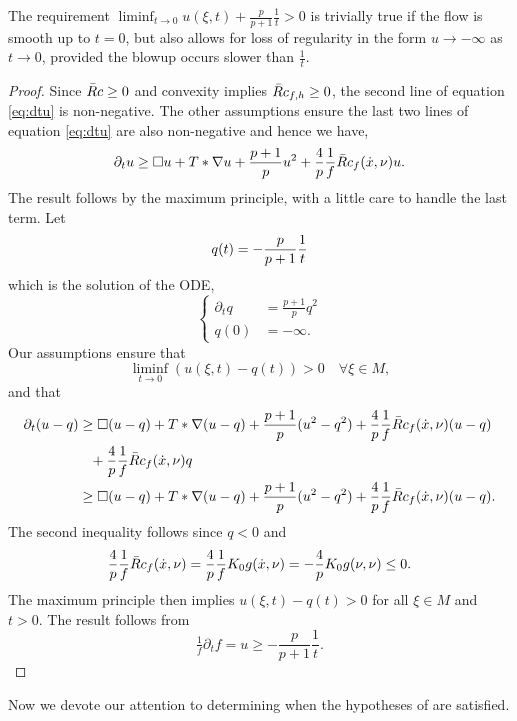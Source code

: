 \begin{rem}
The requirement $\liminf_{t\to 0} u(\xi, t) + \frac{p}{p+1} \tfrac{1}{t} > 0$ is trivially true if the flow is smooth up to $t=0$, but also allows for loss of regularity in the form $u \to -\infty$ as $t \to 0$, provided the blowup occurs slower than $\tfrac{1}{t}$.
\end{rem}

\begin{proof}
Since $\-Rc \geq 0$ and convexity implies $\-Rc_{f,h} \geq 0$, the second line of equation \eqref{eq:dtu} is non-negative. The other assumptions ensure the last two lines of equation \eqref{eq:dtu} are also non-negative and hence we have,
\[
\partial_t u \geq \Box u + T \ast \nabla u + \fr{p+1}{p} u^2 + \frac{4}{p} \frac{1}{f} \-Rc_f(\dot{x}, \nu)u.
\]
The result follows by the maximum principle, with a little care to handle the last term. Let
\[
q(t) = -\fr{p}{p+1} \frac{1}{t}
\]
which is the solution of the ODE,
\[
\begin{cases}
\partial_t q &= \frac{p+1}{p} q^2 \\
q(0) &= -\infty.
\end{cases}
\]
Our assumptions ensure that
\[
\liminf_{t\to 0} (u(\xi, t) - q(t)) > 0 \quad \forall \xi \in M,
\]
and that
\[
\begin{split}
\partial_t (u - q) &\geq \Box (u - q) + T \ast \nabla (u - q) + \fr{p+1}{p}(u^2 - q^2) + \frac{4}{p} \frac{1}{f} \-Rc_f(\dot{x}, \nu)(u - q) \\
&\hp{=} + \frac{4}{p} \frac{1}{f} \-Rc_f(\dot{x}, \nu) q \\
&\geq \Box (u - q) + T \ast \nabla (u - q) + \fr{p+1}{p}(u^2 - q^2) + \frac{4}{p} \frac{1}{f} \-Rc_f(\dot{x}, \nu)(u - q).
\end{split}
\]
The second inequality follows since $q < 0$ and
\[
\frac{4}{p} \frac{1}{f} \-Rc_f(\dot{x}, \nu) = \frac{4}{p} \frac{1}{f} K_0 g (\dot{x}, \nu) = -\frac{4}{p} K_0 g(\nu, \nu) \leq 0.
\]
The maximum principle then implies $u(\xi, t) - q(t) > 0$ for all $\xi \in M$ and $t>0$. The result follows from
\[
\tfrac{1}{f} \partial_t f = u \geq - \frac{p}{p+1} \frac{1}{t}.
\]
\end{proof}

Now we devote our attention to determining when the hypotheses of  are satisfied.



